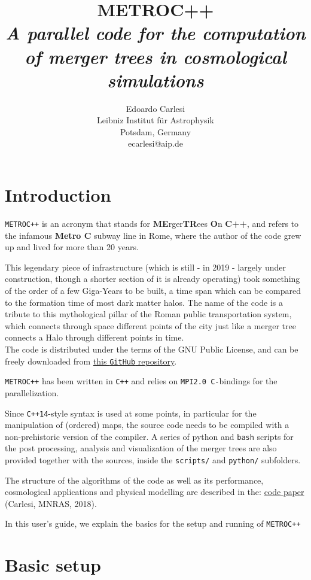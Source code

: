 \documentclass{article}
\title{\textbf{METROC++} \\
\emph{A parallel code for the computation of merger trees in 
cosmological simulations}}
\author{Edoardo Carlesi\\ Leibniz Institut f\"ur Astrophysik\\ Potsdam, Germany\\ ecarlesi@aip.de}
\begin{document}
\maketitle
\tableofcontents
\newpage

\section{Introduction}
\texttt{METROC++} is an acronym that stands for \textbf{ME}rger\textbf{TR}ees \textbf{O}n \textbf{C++}, and refers to the 
infamous \textbf{Metro C} subway line in Rome, where the author of the code grew up and lived for more than 20 years.

This legendary piece of infrastructure (which is still - in 2019 - largely under construction, though a shorter section of 
it is already operating) took something of the order of a few Giga-Years to be built, a time span which can be compared to the
formation time of most dark matter halos. The name of the code is a tribute to this mythological pillar of the Roman public
transportation system, which connects through space different points of the city just like a merger tree connects a Halo 
through different points in time.\\

The code is distributed under the terms of the GNU Public License, and can be freely downloaded from 
\href{https://github.com/EdoardoCarlesi/MetroCPP}{this \texttt{GitHub} repository}.

\texttt{METROC++} has been written in \texttt{C++} and relies on \texttt{MPI2.0 C-}bindings for the parallelization.

Since \texttt{C++14}-style syntax is used at some points, in particular for the manipulation
of (ordered) maps, the source code needs to be compiled with a non-prehistoric version of the compiler.
A series of python and \texttt{bash} scripts for the post processing, analysis and visualization of the merger trees are also provided 
together with the sources, inside the \texttt{scripts/} and \texttt{python/} subfolders.

The structure of the algorithms of the code as well as its performance, cosmological applications and 
physical modelling are described in the:
\href{https://arxiv.org/abs/1612.07053}{code paper} (Carlesi, MNRAS, 2018).

In this user's guide, we explain the basics for the setup and running of \texttt{METROC++}


\section{Basic setup}
\end{document}
